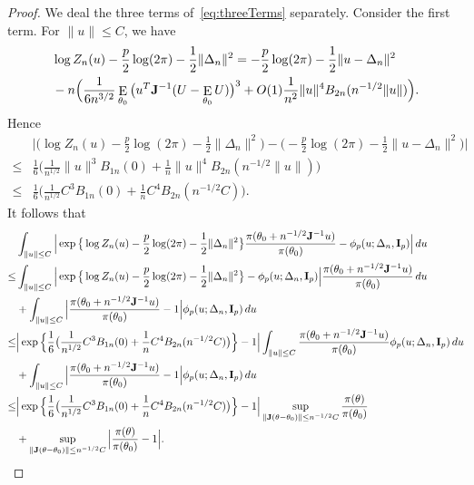 \documentclass[3p]{elsarticle}
\DeclareMathOperator{\myE}{E}
\theoremstyle{plain}
\theoremstyle{definition}
\theoremstyle{remark}
\begin{document}
\begin{proof}
    We deal the three terms of~\eqref{eq:threeTerms} separately.
    Consider the first term. For $\|u\|\leq C$, we have
    $$
    \begin{aligned}
        &\log Z_n(u)-\frac{p}{2}\log (2\pi)-\frac{1}{2}\|\Delta_n\|^2
        =-\frac{p}{2}\log (2\pi)-\frac{1}{2}\|u-\Delta_n\|^2\\
    &-n\Big(\frac{1}{6 n^{3/2}}\myE_{\theta_0}\big(u^T \BJ^{-1}(U-\myE_{\theta_0}U)\big)^3+O(1)\frac{1}{n^2}\|u\|^4 B_{2n}(n^{-1/2}\|u\|)\Big).
    \end{aligned}
    $$
    Hence
    \begin{equation}\label{eq:estimateLikelihood}
        \begin{aligned}
            &\Big|\Big(\log Z_n(u)-\frac{p}{2}\log (2\pi)-\frac{1}{2}\|\Delta_n\|^2\Big)
        -\Big(-\frac{p}{2}\log (2\pi)-\frac{1}{2}\|u-\Delta_n\|^2\Big)\Big|\\
            \leq&
            \frac{1}{6}\Big(
    \frac{1}{n^{1/2}}\|u\|^3 B_{1n}(0)+\frac{1}{n}\|u\|^4 B_{2n}(n^{-1/2}\|u\|)
    \Big)\\
            \leq&
            \frac{1}{6}\Big(
    \frac{1}{n^{1/2}}C^3 B_{1n}(0)+\frac{1}{n}C^4 B_{2n}(n^{-1/2}C)
    \Big).
        \end{aligned}
    \end{equation}
    It follows that
    $$
  \begin{aligned}  
      &\int_{\|u\|\leq C} \Big|
\exp\big\{\log Z_n(u) -\frac{p}{2}\log (2\pi)-\frac{1}{2}\|\Delta_n\|^2\big\}
\frac{\pi(\theta_0+n^{-1/2} \mathbf{J}^{-1}u)}{\pi(\theta_0)}
        -
        \phi_p(u;\Delta_n,\mathbf{I}_p)
        \Big| \, du\\
      \leq&\int_{\|u\|\leq C} \Big|
\exp\big\{\log Z_n(u) -\frac{p}{2}\log (2\pi)-\frac{1}{2}\|\Delta_n\|^2\big\}
        -
        \phi_p(u;\Delta_n,\mathbf{I}_p)  \Big| 
\frac{\pi(\theta_0+n^{-1/2} \mathbf{J}^{-1}u)}{\pi(\theta_0)}
        \, du\\
      &+
      \int_{\|u\|\leq C} \Big|
\frac{\pi(\theta_0+n^{-1/2} \mathbf{J}^{-1}u)}{\pi(\theta_0)}-1
      \Big|
        \phi_p(u;\Delta_n,\mathbf{I}_p)
         \, du\\
\leq&
      \Big|
      \exp\Big\{\frac{1}{6}\big(
    \frac{1}{n^{1/2}}C^3 B_{1n}(0)+\frac{1}{n}C^4 B_{2n}(n^{-1/2}C)
      \big)\Big\}
        -
        1
          \Big| 
      \int_{\|u\|\leq C} 
\frac{\pi(\theta_0+n^{-1/2} \mathbf{J}^{-1}u)}{\pi(\theta_0)}
\phi_p(u;\Delta_n,\mathbf{I}_p)
        \, du\\
      &+
      \int_{\|u\|\leq C} \Big|
\frac{\pi(\theta_0+n^{-1/2} \mathbf{J}^{-1}u)}{\pi(\theta_0)}-1
      \Big|
        \phi_p(u;\Delta_n,\mathbf{I}_p)
         \, du\\
\leq&
      \Big|
      \exp\Big\{\frac{1}{6}\big(
    \frac{1}{n^{1/2}}C^3 B_{1n}(0)+\frac{1}{n}C^4 B_{2n}(n^{-1/2}C)
      \big)\Big\}
        -
        1
          \Big| 
      \sup_{\|\mathbf{J}(\theta-\theta_0)\|\leq n^{-1/2} C}\frac{\pi(\theta)}{\pi(\theta_0)}\\
      &+
      \sup_{\|\mathbf{J}(\theta-\theta_0)\|\leq n^{-1/2} C}
      \Big|\frac{\pi(\theta)}{\pi(\theta_0)}-1\Big|.
  \end{aligned}
    $$


\end{proof}
\end{document}

